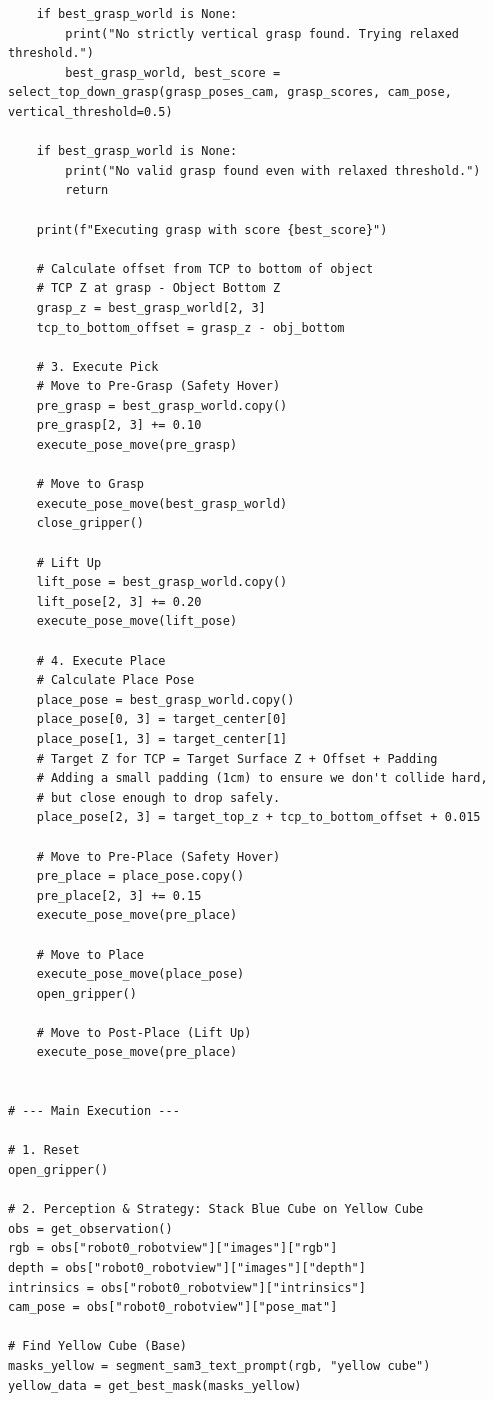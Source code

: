 \begin{lstlisting}
    if best_grasp_world is None:
        print("No strictly vertical grasp found. Trying relaxed threshold.")
        best_grasp_world, best_score = select_top_down_grasp(grasp_poses_cam, grasp_scores, cam_pose, vertical_threshold=0.5)

    if best_grasp_world is None:
        print("No valid grasp found even with relaxed threshold.")
        return

    print(f"Executing grasp with score {best_score}")

    # Calculate offset from TCP to bottom of object
    # TCP Z at grasp - Object Bottom Z
    grasp_z = best_grasp_world[2, 3]
    tcp_to_bottom_offset = grasp_z - obj_bottom

    # 3. Execute Pick
    # Move to Pre-Grasp (Safety Hover)
    pre_grasp = best_grasp_world.copy()
    pre_grasp[2, 3] += 0.10
    execute_pose_move(pre_grasp)

    # Move to Grasp
    execute_pose_move(best_grasp_world)
    close_gripper()

    # Lift Up
    lift_pose = best_grasp_world.copy()
    lift_pose[2, 3] += 0.20
    execute_pose_move(lift_pose)

    # 4. Execute Place
    # Calculate Place Pose
    place_pose = best_grasp_world.copy()
    place_pose[0, 3] = target_center[0]
    place_pose[1, 3] = target_center[1]
    # Target Z for TCP = Target Surface Z + Offset + Padding
    # Adding a small padding (1cm) to ensure we don't collide hard, 
    # but close enough to drop safely.
    place_pose[2, 3] = target_top_z + tcp_to_bottom_offset + 0.015 

    # Move to Pre-Place (Safety Hover)
    pre_place = place_pose.copy()
    pre_place[2, 3] += 0.15
    execute_pose_move(pre_place)

    # Move to Place
    execute_pose_move(place_pose)
    open_gripper()

    # Move to Post-Place (Lift Up)
    execute_pose_move(pre_place)


# --- Main Execution ---

# 1. Reset
open_gripper()

# 2. Perception & Strategy: Stack Blue Cube on Yellow Cube
obs = get_observation()
rgb = obs["robot0_robotview"]["images"]["rgb"]
depth = obs["robot0_robotview"]["images"]["depth"]
intrinsics = obs["robot0_robotview"]["intrinsics"]
cam_pose = obs["robot0_robotview"]["pose_mat"]

# Find Yellow Cube (Base)
masks_yellow = segment_sam3_text_prompt(rgb, "yellow cube")
yellow_data = get_best_mask(masks_yellow)


\end{lstlisting}
